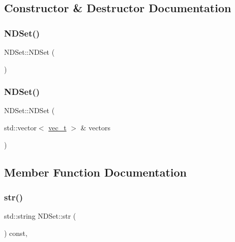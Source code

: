 \subsection{Constructor \& Destructor Documentation}
\mbox{\label{class_n_d_set_a906983146babefe3d4824d282887c083}} 
\subsubsection{\texorpdfstring{NDSet()}{NDSet()}\hspace{0.1cm}{\footnotesize\ttfamily [1/2]}}
{\footnotesize\ttfamily N\+D\+Set\+::\+N\+D\+Set (\begin{DoxyParamCaption}{ }\end{DoxyParamCaption})}

\mbox{\label{class_n_d_set_a2f01f90688a50dffc1b1b19ab3e34a7f}} 
\subsubsection{\texorpdfstring{NDSet()}{NDSet()}\hspace{0.1cm}{\footnotesize\ttfamily [2/2]}}
{\footnotesize\ttfamily N\+D\+Set\+::\+N\+D\+Set (\begin{DoxyParamCaption}\item[{std\+::vector$<$ \mbox{\hyperlink{_n_vector_8h_a0a2cfc67e738a3d73e4f12098c4c07f6}{vec\+\_\+t}} $>$ \&}]{vectors }\end{DoxyParamCaption})\hspace{0.3cm}{\ttfamily [explicit]}}



\subsection{Member Function Documentation}
\mbox{\label{class_n_d_set_ada343b5d74ced1894dfe098c6324d61e}} 
\subsubsection{\texorpdfstring{str()}{str()}}
{\footnotesize\ttfamily std\+::string N\+D\+Set\+::str (\begin{DoxyParamCaption}{ }\end{DoxyParamCaption}) const\hspace{0.3cm}{\ttfamily [override]}, {\ttfamily [virtual]}}



